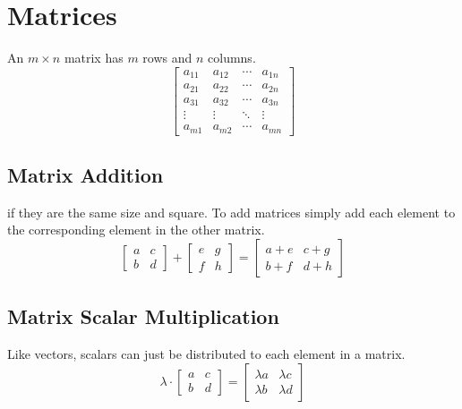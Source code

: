 \documentclass{tufte-book}
\begin{document}
\section{Matrices}

 An $m \times n$ matrix has $m$ rows and $n$ columns.
\[
	\begin{bmatrix}
		a_{11} & a_{12} & \cdots & a_{1n} \\
		a_{21} & a_{22} & \cdots & a_{2n} \\
		a_{31} & a_{32} & \cdots & a_{3n} \\
		\vdots & \vdots & \ddots & \vdots \\
		a_{m1} & a_{m2} & \cdots & a_{mn}
	\end{bmatrix}
\]

\subsection{Matrix Addition}
 if they are the same size and square. To add matrices simply add each element
to the corresponding element in the other matrix.
\[
	\begin{bmatrix}
		a & c \\
		b & d
	\end{bmatrix}
	+
	\begin{bmatrix}
		e & g \\
		f & h
	\end{bmatrix}
	=
	\begin{bmatrix}
		a+e & c+g \\
		b+f & d+h
	\end{bmatrix}
\]

\subsection{Matrix Scalar Multiplication}
Like vectors, scalars can just be distributed to each element in a matrix.
\begin{equation*}
	\lambda \cdot
	\begin{bmatrix}
		a & c \\
		b & d
	\end{bmatrix}
	=
	\begin{bmatrix}
		\lambda a & \lambda c \\
		\lambda b & \lambda d
	\end{bmatrix}
\end{equation*}
\end{document}

